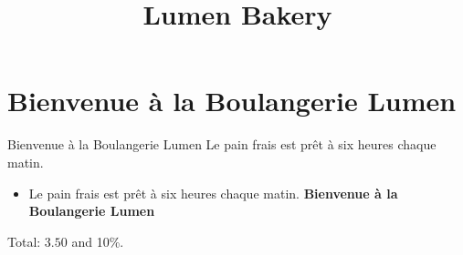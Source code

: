 \documentclass{article}
\title{Lumen Bakery}
\begin{document}
\maketitle
\section{Bienvenue à la Boulangerie Lumen}
Bienvenue à la Boulangerie Lumen
Le pain frais est prêt à six heures chaque matin.

\begin{itemize}
\item Le pain frais est prêt à six heures chaque matin. \textbf{Bienvenue à la Boulangerie Lumen}
\end{itemize}
Total: $3.50$ and 10\%.
\end{document}
